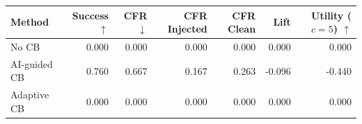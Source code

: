 \begin{tabular}{lrrrrrr}
\toprule
Method & Success $\uparrow$ & CFR $\downarrow$ & CFR Injected & CFR Clean & Lift & Utility ($c=5$) $\uparrow$ \\
\midrule
No CB & 0.000 & 0.000 & 0.000 & 0.000 & 0.000 & 0.000 \\
AI-guided CB & 0.760 & 0.667 & 0.167 & 0.263 & -0.096 & -0.440 \\
Adaptive CB & 0.000 & 0.000 & 0.000 & 0.000 & 0.000 & 0.000 \\
\bottomrule
\end{tabular}
